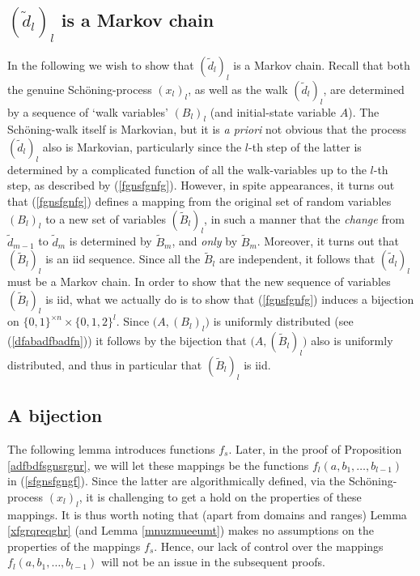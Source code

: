 \documentclass[a4paper,aps,floatfix]{revtex4}
\begin{document}


\subsection{$(\tilde{d}_l)_l$ is a Markov chain}

In the following we wish to show that $(\tilde{d}_l)_l$ is a Markov chain. Recall that  both the genuine Sch\"oning-process  $(x_l)_l$, as well as the walk $(\tilde{d}_l)_l$, are determined by a sequence of  `walk variables' $(B_l)_l$ (and initial-state variable $A$). The  Sch\"oning-walk itself is Markovian, but it is \emph{a priori} not  obvious that the process $(\tilde{d}_l)_l$ also is Markovian, particularly since the $l$-th step of the latter is determined by a complicated function  of all the walk-variables up to the $l$-th step, as described  by  (\ref{fgnsfgnfg}). However, in spite appearances, it turns out that (\ref{fgnsfgnfg}) defines a mapping from the original set of random variables $(B_l)_l$ to a new set of variables  $(\tilde{B}_l)_l$,  in such a manner that  the \emph{change} from $\tilde{d}_{m-1}$ to $\tilde{d}_m$ is determined by $\tilde{B}_m$, and \emph{only} by  $\tilde{B}_m$.  Moreover, it turns out that $(\tilde{B}_l)_l$ is an iid sequence. 
Since all the $\tilde{B}_l$ are independent, it follows that $(\tilde{d}_l)_l$ must be a Markov chain.  In order to show that the new sequence of variables  $(\tilde{B}_l)_l$ is iid, what we actually do is to show that  (\ref{fgnsfgnfg}) induces a bijection on $\{0,1\}^{\times n}\times\{0,1,2\}^{l}$. Since $\big(A, (B_l)_l\big)$ is uniformly distributed (see (\ref{dfabadfbadfn})) it follows by the bijection that  $\big(A, (\tilde{B}_l)_l\big)$ also is uniformly distributed, and thus in particular that $(\tilde{B}_l)_l$ is iid.




\subsection{A bijection}


The following lemma introduces functions $f_s$.  Later, in the proof of Proposition \ref{adfbdfsgnsrgnr}, we will let these mappings be  the functions $f_l(a,b_1,\ldots,b_{l-1})$ in (\ref{sfgnsfgngf}). Since the latter  are algorithmically defined, via the  Sch\"oning-process $(x_l)_l$, it is challenging to get a hold on the properties of these mappings. It is thus worth noting that (apart from domains and ranges) Lemma  \ref{xfgrqreqghr} (and Lemma \ref{mnuzmueeumt}) makes no assumptions on the properties of the mappings $f_s$. Hence, our lack of control over the mappings $f_l(a,b_1,\ldots,b_{l-1})$ will not be an issue in the subsequent proofs.
\end{document}
